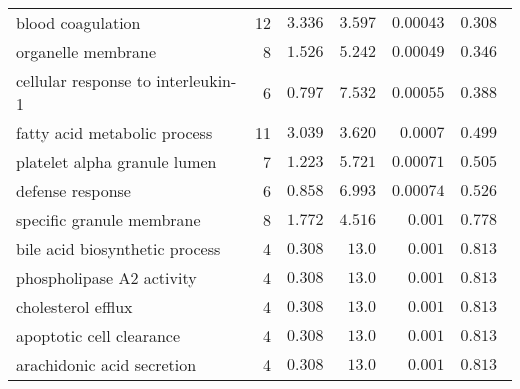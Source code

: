 \documentclass{article}
\begin{document}
\begin{longtable}{|l|r|r|r|r|r|}
                                 blood coagulation &                      12 &                $ 3.336$ &   $ 3.597$ &            $0.00043$ &                     $ 0.308~~$ \\
                                organelle membrane &                       8 &                $ 1.526$ &   $ 5.242$ &            $0.00049$ &                     $ 0.346~~$ \\
                cellular response to interleukin-1 &                       6 &                $ 0.797$ &   $ 7.532$ &            $0.00055$ &                     $ 0.388~~$ \\
                      fatty acid metabolic process &                      11 &                $ 3.039$ &   $ 3.620$ &             $0.0007$ &                     $ 0.499~~$ \\
                      platelet alpha granule lumen &                       7 &                $ 1.223$ &   $ 5.721$ &            $0.00071$ &                     $ 0.505~~$ \\
                                  defense response &                       6 &                $ 0.858$ &   $ 6.993$ &            $0.00074$ &                     $ 0.526~~$ \\
                         specific granule membrane &                       8 &                $ 1.772$ &   $ 4.516$ &             $ 0.001$ &                     $ 0.778~~$ \\
                    bile acid biosynthetic process &                       4 &                $ 0.308$ &   $  13.0$ &             $ 0.001$ &                     $ 0.813~~$ \\
                         phospholipase A2 activity &                       4 &                $ 0.308$ &   $  13.0$ &             $ 0.001$ &                     $ 0.813~~$ \\
                                cholesterol efflux &                       4 &                $ 0.308$ &   $  13.0$ &             $ 0.001$ &                     $ 0.813~~$ \\
                          apoptotic cell clearance &                       4 &                $ 0.308$ &   $  13.0$ &             $ 0.001$ &                     $ 0.813~~$ \\
                        arachidonic acid secretion &                       4 &                $ 0.308$ &   $  13.0$ &             $ 0.001$ &                     $ 0.813~~$ \\
\end{longtable}
\end{document}
